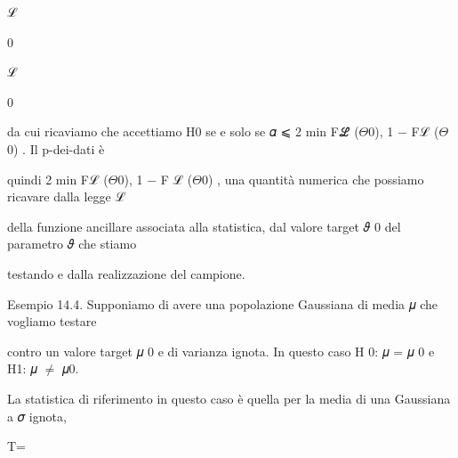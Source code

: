 \documentclass[a4paper,portrait,12pt]{article}
\begin{document}
\begin{flushleft}
ℒ
\end{flushleft}





0





\begin{flushleft}
ℒ
\end{flushleft}





0





\begin{flushleft}
da cui ricaviamo che accettiamo H0 se e solo se 𝛼 ⩽ 2 min Fℒ ($\Theta$0), 1 $-$ Fℒ ($\Theta$0) . Il p-dei-dati \`{e}
\end{flushleft}


\begin{flushleft}
quindi 2 min Fℒ ($\Theta$0), 1 $-$ F ℒ ($\Theta$0) , una quantit\`{a} numerica che possiamo ricavare dalla legge ℒ
\end{flushleft}


\begin{flushleft}
della funzione ancillare associata alla statistica, dal valore target 𝜗 0 del parametro 𝜗 che stiamo
\end{flushleft}


\begin{flushleft}
testando e dalla realizzazione del campione.
\end{flushleft}


\begin{flushleft}
Esempio 14.4. Supponiamo di avere una popolazione Gaussiana di media 𝜇 che vogliamo testare
\end{flushleft}


\begin{flushleft}
contro un valore target 𝜇 0 e di varianza ignota. In questo caso H 0: 𝜇 = 𝜇 0 e H1: 𝜇 $\neq$ 𝜇0.
\end{flushleft}


\begin{flushleft}
La statistica di riferimento in questo caso \`{e} quella per la media di una Gaussiana a 𝜎 ignota,
\end{flushleft}


\begin{flushleft}
T=
\end{flushleft}
\end{document}
